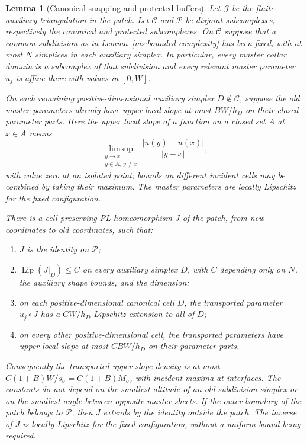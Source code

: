 \documentclass[11pt]{article}
\numberwithin{equation}{section}
\newtheorem{lemma}[theorem]{Lemma}
\theoremstyle{definition}
\theoremstyle{remark}
\begin{document}
\begin{lemma}[Canonical snapping and protected buffers]
\label{ms:snapping}
Let $\mathcal G$ be the finite auxiliary triangulation in the patch.
Let $\mathcal C$ and $\mathcal P$ be disjoint subcomplexes, respectively
the canonical and protected subcomplexes.  On $\mathcal C$ suppose
that a common subdivision as in
Lemma~\ref{ms:bounded-complexity} has been fixed, with at most $N$
simplices in each auxiliary simplex.  In particular, every master
collar domain is a subcomplex of that subdivision and every relevant
master parameter $u_j$ is affine there with values in $[0,W]$.

On each remaining positive-dimensional auxiliary simplex
$D\notin\mathcal C$, suppose the old master parameters already have
upper local slope at most $B W/h_D$ on their closed parameter parts.
Here the upper local slope of a function on a closed set $A$ at
$x\in A$ means
\[
 \limsup_{\substack{y\to x\\y\in A,\ y\ne x}}
 \frac{|u(y)-u(x)|}{|y-x|},
\]
with value zero at an isolated point; bounds on different incident
cells may be combined by taking their maximum.  The master
parameters are locally Lipschitz for the fixed configuration.

There is a cell-preserving PL homeomorphism $J$ of the patch, from
new coordinates to old coordinates, such that:
\begin{enumerate}
\item $J$ is the identity on $\mathcal P$;
\item $\operatorname{Lip}(J|_D)\leq C$ on every auxiliary simplex $D$, with $C$
depending only on $N$, the auxiliary shape bounds, and the dimension;
\item on each positive-dimensional canonical cell $D$, the transported parameter
$u_j\circ J$ has a $C W/h_D$-Lipschitz extension to all of $D$;
\item on every other positive-dimensional cell, the transported parameters have upper
local slope at most $C B W/h_D$ on their parameter parts.
\end{enumerate}
Consequently the transported upper slope density is at most
$C(1+B)W/s_\sigma=C(1+B)M_\sigma$, with incident maxima at
interfaces.  The constants do not depend on the smallest altitude
of an old subdivision simplex or on the smallest angle between
opposite master sheets.
If the outer boundary of the patch belongs to $\mathcal P$, then
$J$ extends by the identity outside the patch.  The inverse of $J$
is locally Lipschitz for the fixed configuration, without a uniform
bound being required.
\end{lemma}
\end{document}
